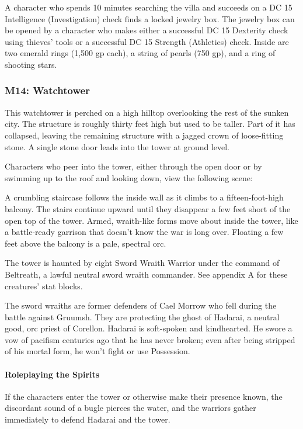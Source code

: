 \documentclass[10pt,a4paper,twoside,bg=print,twocolumn,openany,nodeprecatedcode]{dndbook}
\begin{document}
A character who spends 10 minutes searching the villa and succeeds on a DC 15 Intelligence (Investigation) check finds a locked jewelry box. The jewelry box can be opened by a character who makes either a successful DC 15 Dexterity check using thieves' tools or a successful DC 15 Strength (Athletics) check. Inside are two emerald rings (1,500 gp each), a string of pearls (750 gp), and a ring of shooting stars.

\subsubsection{M14: Watchtower}
\begin{DndReadAloud}{}
This watchtower is perched on a high hilltop overlooking the rest of the sunken city. The structure is roughly thirty feet high but used to be taller. Part of it has collapsed, leaving the remaining structure with a jagged crown of loose-fitting stone. A single stone door leads into the tower at ground level.

\end{DndReadAloud}

Characters who peer into the tower, either through the open door or by swimming up to the roof and looking down, view the following scene:

\begin{DndReadAloud}{}
A crumbling staircase follows the inside wall as it climbs to a fifteen-foot-high balcony. The stairs continue upward until they disappear a few feet short of the open top of the tower. Armed, wraith-like forms move about inside the tower, like a battle-ready garrison that doesn't know the war is long over. Floating a few feet above the balcony is a pale, spectral orc.

\end{DndReadAloud}

The tower is haunted by eight Sword Wraith Warrior under the command of Beltreath, a lawful neutral sword wraith commander. See appendix A for these creatures' stat blocks.

The sword wraiths are former defenders of Cael Morrow who fell during the battle against Gruumsh. They are protecting the ghost of Hadarai, a neutral good, orc priest of Corellon. Hadarai is soft-spoken and kindhearted. He swore a vow of pacifism centuries ago that he has never broken; even after being stripped of his mortal form, he won't fight or use Possession.

\paragraph{Roleplaying the Spirits}
If the characters enter the tower or otherwise make their presence known, the discordant sound of a bugle pierces the water, and the warriors gather immediately to defend Hadarai and the tower.
\end{document}
